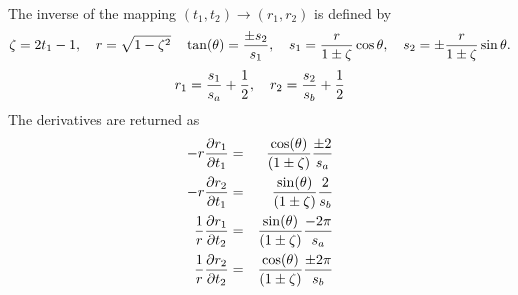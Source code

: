 The inverse of the mapping $(t_1,t_2)\rightarrow (r_1,r_2)$ is defined by
\[
 \zeta=2t_1-1, \quad r=\sqrt{1-\zeta^2}\quad \tan(\theta)={\pm s_2 \over s_1}, \quad
 s_1={r\over1\pm\zeta}\cos\theta,\quad
 s_2=\pm{r\over 1\pm\zeta}\sin\theta.
\]
\[
 r_1={s_1\over s_a}+{1\over2} , \quad  r_2={s_2\over s_b}+{1\over2}
\]
The derivatives are returned as
\begin{eqnarray*}
-r {\partial r_1 \over \partial t_1 } &=& {\cos(\theta) \over (1\pm\zeta)} {\pm2  \over s_a}  \\
-r {\partial r_2 \over \partial t_1 } &=& {\sin(\theta) \over (1\pm\zeta)} {2 \over s_b}  \\
{1\over r}{\partial r_1 \over \partial t_2 } &=& {\sin(\theta) \over (1\pm\zeta)} {-2\pi \over s_a}  \\
{1\over r}{\partial r_2 \over \partial t_2 } &=& {\cos(\theta) \over (1\pm\zeta)} {\pm 2\pi \over s_b}  
\end{eqnarray*}

% 
% 
% 
% 
% 
% 
% 

